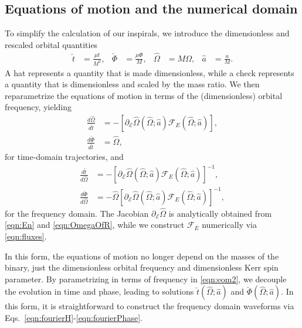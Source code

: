 \documentclass[%
 reprint,
 nofootinbib,
 amsmath,amssymb,
 aps,
 prd,
]{revtex4-2}
\begin{document}
\subsection{Equations of motion and the numerical domain}
\label{sec:eom}

To simplify the calculation of our inspirals, we introduce the dimensionless and rescaled orbital quantities
\begin{align}
    \check{t} &= \frac{\mu t}{M^2},
    &
    \check{\Phi} &= \frac{\mu \Phi}{M},
    &
    \hat{\Omega} &= M \Omega,
    &
    \hat{a} &= \frac{a}{M}.
\end{align} 
A hat represents a quantity that is made dimensionless, while a check represents a quantity that is dimensionless and scaled by the mass ratio. We then reparametrize the equations of motion in terms of the (dimensionless) orbital frequency, yielding
\begin{subequations} \label{eqn:eom1}
\begin{align} \label{eqn:dOmegadT}
    \frac{d\hat{\Omega}}{d\check{t}} &= -\left[\partial_{\mathcal{E}}\hat{\Omega}(\hat{\Omega}; \hat{a}) {\mathcal{F}}_E(\hat{\Omega}; \hat{a})\right],
    \\ \label{eqn:dPhidT}
    \frac{d\check{\Phi}}{d\check{t}} &= \hat{\Omega},
\end{align} 
\end{subequations}
for time-domain trajectories, and 
\begin{subequations} \label{eqn:eom2}
\begin{align} \label{eqn:dtdOmega}
    \frac{d\check{t}}{d\hat{\Omega}} &= -\left[\partial_{\mathcal{E}}\hat{\Omega}(\hat{\Omega}; \hat{a}) {\mathcal{F}}_E(\hat{\Omega}; \hat{a})\right]^{-1},
    \\ \label{eqn:dPhidOmega}
    \frac{d\check{\Phi}}{d\hat{\Omega}} &= -\hat{\Omega} \left[\partial_{\mathcal{E}}\hat{\Omega}(\hat{\Omega}; \hat{a}) {\mathcal{F}}_E(\hat{\Omega}; \hat{a})\right]^{-1},
\end{align} 
\end{subequations}
for the frequency domain.
The Jacobian $\partial_{\mathcal{E}}\hat{\Omega}$ is analytically obtained from \eqref{eqn:En} and \eqref{eqn:OmegaOfR}, while we construct ${\mathcal{F}}_E$ numerically via \eqref{eqn:fluxes}.

In this form, the equations of motion no longer depend on the masses of the binary, just the dimensionless orbital frequency and dimensionless Kerr spin parameter. By parametrizing in terms of frequency in \eqref{eqn:eom2}, we decouple the evolution in time and phase, leading to solutions $\check{t}(\hat{\Omega}; \hat{a})$ and $\check{\Phi}(\hat{\Omega}; \hat{a})$. In this form, it is straightforward to construct the frequency domain waveforms via Eqs.~\eqref{eqn:fourierH}-\eqref{eqn:fourierPhase}.
\end{document}
